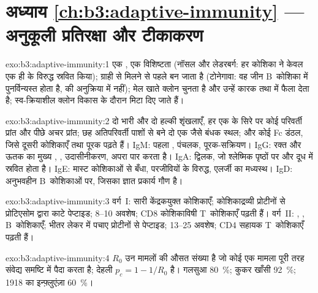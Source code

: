 \section*{अध्याय \ref{ch:b3:adaptive-immunity} --- अनुकूली प्रतिरक्षा और टीकाकरण}

\begin{solution}{exo:b3:adaptive-immunity:1}
एक , एक विशिष्टता (नॉसल और लेडरबर्ग: हर कोशिका ने केवल एक ही
 के विरुद्ध  स्रवित किया); ग्राही  से मिलने से
पहले बन जाता है (टोनेगावा: वह जीन B~कोशिका में पुनर्विन्यस्त होता है,
 की अनुक्रिया में नहीं);  मेल खाते क्लोन चुनता है और
उन्हें कारक तथा  में फैला देता है; स्व-क्रियाशील क्लोन
विकास के दौरान मिटा दिए जाते हैं।
\end{solution}

\begin{solution}{exo:b3:adaptive-immunity:2}
दो भारी और दो हल्की शृंखलाएँ, हर एक के सिरे पर कोई परिवर्ती प्रांत और
पीछे अचर प्रांत; छह अतिपरिवर्ती पाशों से बने दो एक जैसे बंधक स्थल; और
कोई Fc डंठल, जिसे दूसरी कोशिकाएँ तथा पूरक पढ़ते हैं। IgM: पहला
, पंचलक, पूरक-सक्रियण। IgG: रक्त और ऊतक का मुख्य ,
, उदासीनीकरण, अपरा पार करता है। IgA: द्विलक, जो श्लेष्मिक
पृष्ठों पर और दूध में स्रवित होता है। IgE: मास्ट कोशिकाओं से बँधा,
परजीवियों के विरुद्ध, एलर्जी का मध्यस्थ। IgD: अनुभवहीन B~कोशिकाओं पर,
जिसका ज्ञात प्रकार्य गौण है।
\end{solution}

\begin{solution}{exo:b3:adaptive-immunity:3}
वर्ग~I: सारी केंद्रकयुक्त कोशिकाएँ; कोशिकाद्रव्यी प्रोटीनों से
प्रोटिएसोम द्वारा काटे पेप्टाइड; 8--10 अवशेष; CD8 कोशिकाविषी
T~कोशिकाएँ पढ़ती हैं। वर्ग~II: , , B~कोशिकाएँ;
भीतर लेकर  में पचाए प्रोटीनों से पेप्टाइड; 13--25 अवशेष; CD4
सहायक T~कोशिकाएँ पढ़ती हैं।
\end{solution}

\begin{solution}{exo:b3:adaptive-immunity:4}
$R_{0}$ उन मामलों की औसत संख्या है जो कोई एक मामला पूरी तरह संवेद्य
समष्टि में पैदा करता है; देहली $p_{c} = 1 - 1/R_{0}$ है। गलसुआ
\qty{80}{\%}; कुकर खाँसी \qty{92}{\%}; 1918 का इन्फ़्लुएंज़ा \qty{60}{\%}।
\end{solution}

